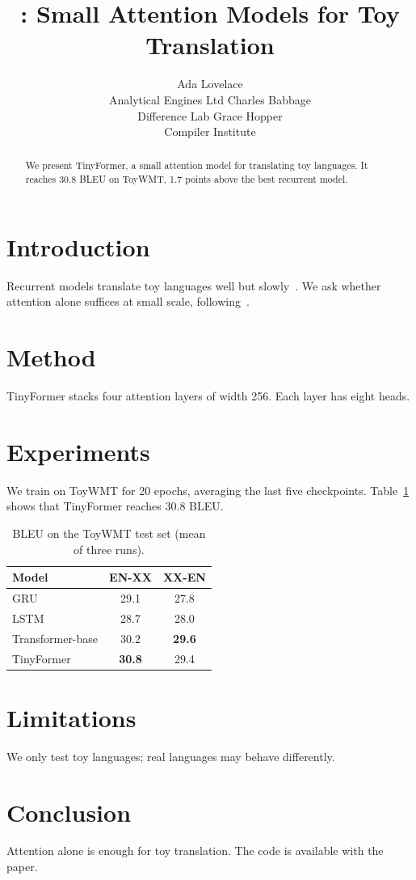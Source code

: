 \documentclass{article}
\title{\method: Small Attention Models for Toy Translation}
\author{Ada Lovelace \\ Analytical Engines Ltd \And Charles Babbage \\ Difference Lab \And Grace Hopper \\ Compiler Institute}
\newcommand{\method}{TinyFormer}
\begin{document}
\maketitle
\begin{abstract}
We present \method, a small attention model for translating toy languages.
It reaches 30.8 BLEU on ToyWMT, 1.7 points above the best recurrent model.
\end{abstract}

\section{Introduction}
Recurrent models translate toy languages well but slowly~\cite{elman1990}.
We ask whether attention alone suffices at small scale, following~\cite{bahdanau2015}.

\section{Method}
\method{} stacks four attention layers of width 256.
Each layer has eight heads.

\section{Experiments}
We train on ToyWMT for 20 epochs, averaging the last five checkpoints.
Table~\ref{tab:main} shows that \method{} reaches 30.8 BLEU.

\begin{table}[t]
\centering
\caption{BLEU on the ToyWMT test set (mean of three runs).}\label{tab:main}
\begin{tabular}{lcc}
\toprule
Model & EN-XX & XX-EN \\
\midrule
GRU & 29.1 & 27.8 \\
LSTM & 28.7 & 28.0 \\
Transformer-base & 30.2 & \textbf{29.6} \\
\method{} & \textbf{30.8} & 29.4 \\
\bottomrule
\end{tabular}
\end{table}

\section{Limitations}
We only test toy languages; real languages may behave differently.

\section{Conclusion}
Attention alone is enough for toy translation.
The code is available with the paper.



\end{document}
